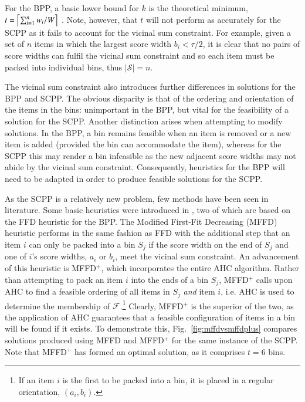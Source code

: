 \documentclass[authoryear]{elsarticle}
\begin{document}
For the BPP, a basic lower bound for $k$ is the theoretical minimum, $t = \ceil*{\sum_{i=1}^{n} w_i / W}$ \citep{martello1990l}. Note, however, that $t$ will not perform as accurately for the SCPP as it fails to account for the vicinal sum constraint. For example, given a set of $n$ items in which the largest score width $b_i < \tau / 2$, it is clear that no pairs of score widths can fulfil the vicinal sum constraint and so each item must be packed into individual bins, thus $|\mathcal{S}| = n$.

The vicinal sum constraint also introduces further differences in solutions for the BPP and SCPP. The obvious disparity is that of the ordering and orientation of the items in the bins: unimportant in the BPP, but vital for the feasibility of a solution for the SCPP. Another distinction arises when attempting to modify solutions. In the BPP, a bin remains feasible when an item is removed or a new item is added (provided the bin can accommodate the item), whereas for the SCPP this may render a bin infeasible as the new adjacent score widths may not abide by the vicinal sum constraint. Consequently, heuristics for the BPP will need to be adapted in order to produce feasible solutions for the SCPP.

As the SCPP is a relatively new problem, few methods have been seen in literature. Some basic heuristics were introduced in \citet{hawa2018}, two of which are based on the FFD heuristic for the BPP. The Modified First-Fit Decreasing (MFFD) heuristic performs in the same fashion as FFD with the additional step that an item $i$ can only be packed into a bin $S_j$ if the score width on the end of $S_j$ and one of $i$'s score widths, $a_i$ or $b_i$, meet the vicinal sum constraint. An advancement of this heuristic is MFFD$^+$, which incorporates the entire AHC algorithm. Rather than attempting to pack an item $i$ into the ends of a bin $S_j$, MFFD$^+$ calls upon AHC to find a feasible ordering of all items in $S_j$ \emph{and} item $i$, i.e. AHC is used to determine the membership of $\mathcal{F}$.\footnote{If an item $i$ is the first to be packed into a bin, it is placed in a regular orientation, $(a_i, b_i)$.} Clearly, MFFD$^+$ is the superior of the two, as the application of AHC guarantees that a feasible configuration of items in a bin will be found if it exists. To demonstrate this, Fig.~\ref{fig:mffdvsmffdplus} compares solutions produced using MFFD and MFFD$^+$ for the same instance of the SCPP. Note that MFFD$^+$ has formed an optimal solution, as it comprises $t = 6$ bins.
\end{document}

